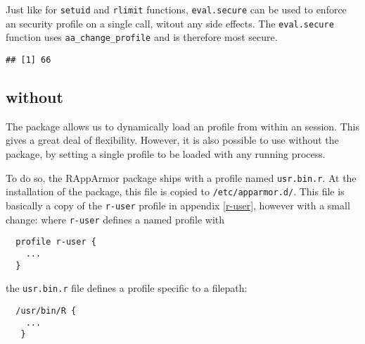 

Just like for \texttt{setuid} and \texttt{rlimit} functions,
\texttt{eval.secure} can be used to enforce an \AppArmor security profile on a
single call, witout any side effects. The \texttt{eval.secure} function uses
\texttt{aa\_change\_profile} and is therefore most secure.

\begin{knitrout}\mycodesize
{}\color{fgcolor}\begin{kframe}
\begin{alltt}
 \hlkwb{<-} \hlstd{(}\hlstd{(}\hlstd{))}
\end{alltt}
\begin{verbatim}
## [1] 66
\end{verbatim}
\begin{alltt}
 \hlkwb{<-} \hlstd{(}\hlstd{(}\hlstd{),}  \hlstd{=} \hlstd{)}
\end{alltt}


\end{kframe}
\end{knitrout}


\subsection{\AppArmor without \RAppArmor}
\label{usr.bin.r}

The \RAppArmor package allows us to dynamically load an \AppArmor profile from
within an \R session. This gives a great deal of flexibility. However, it is
also possible to use \AppArmor without the \RAppArmor package, by setting a
single profile to be loaded with any running \R process.

To do so, the RAppArmor package ships with a profile named \texttt{usr.bin.r}.
At the installation of the package, this file is copied to
\texttt{/etc/apparmor.d/}. This file is basically a copy of the \texttt{r-user}
profile in appendix \ref{r-user}, however with a small change: where
\texttt{r-user} defines a named profile with
\begin{verbatim}
  profile r-user {
    ...
  }
\end{verbatim}
the \texttt{usr.bin.r} file defines a profile specific to a filepath:
\begin{verbatim}
  /usr/bin/R {
    ...
   }
\end{verbatim}


